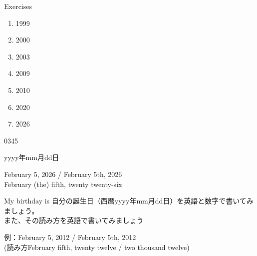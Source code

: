 \documentclass[aspectratio=169,xcolor={dvipsnames,table}]{beamer}
\begin{document}
\begin{frame}[plain]{Exercises}

\Large
\begin{enumerate}
 \item 1999\hfill{}\hspace{200pt}\mbox{}
 \item 2000\hfill{}\hspace{200pt}\mbox{}
 \item 2003\hfill{}\hspace{200pt}\mbox{}
 \item 2009\hfill{}\hspace{200pt}\mbox{}
 \item 2010\hfill{}\hspace{200pt}\mbox{}
 \item 2020\hfill{}\hspace{200pt}\mbox{}
 \item 2026\hfill{}\hspace{200pt}\mbox{}
\end{enumerate}
\mbox{}\hfill{\tiny 0345}\,{\scriptsize {}}

\end{frame}
\begin{frame}[plain]{yyyy年mm月dd日}

\begin{description}[　　　　　　　　　]
 \item[2026年2月5日] February 5, 2026 / February 5th, 2026\\
February (the) fifth, twenty twenty-six
\end{description}
\end{frame}
\begin{frame}[plain]{My birthday is \fbox{　　　　　　}}
 自分の誕生日（西暦yyyy年mm月dd日）を英語と数字で書いてみましょう。\\
また、その読み方を英語で書いてみましょう 

\vspace{80pt}
例：February 5, 2012 /  February 5th, 2012\\
\hfill(読み方February fifth, twenty twelve / two thousand twelve)
 
\end{frame}
\end{document}
